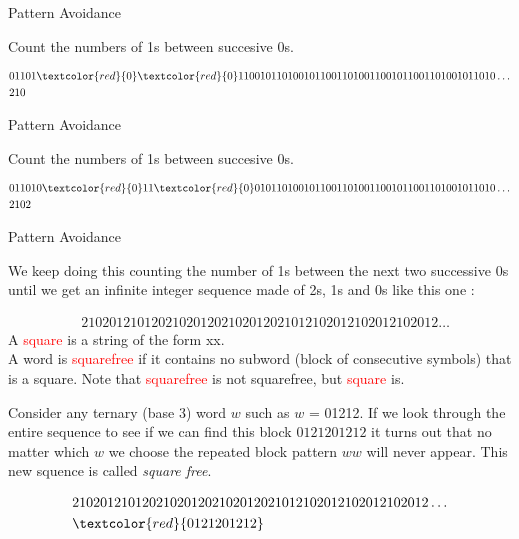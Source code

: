 \documentclass{beamer}
\begin{document}
\begin{frame}{Pattern Avoidance}

    Count the numbers of 1s between succesive 0s.
    
    \[
    \begin{aligned}
        &01101\textcolor{red}{0}\textcolor{red}{0}11001011010010110011010011001011001101001011010\dots \\ 
        &210
    \end{aligned}
    \]
 
\end{frame}

\begin{frame}{Pattern Avoidance}

    Count the numbers of 1s between succesive 0s.
    
    \[
    \begin{aligned}
        &011010\textcolor{red}{0}11\textcolor{red}{0}01011010010110011010011001011001101001011010\dots \\ 
        &2102
    \end{aligned}
    \]
 
\end{frame}

\begin{frame}{Pattern Avoidance}

    We keep doing this counting the number of 1s between the next two successive 0s until we get an infinite integer sequence made of 2s, 1s and 0s like this one :
    
    \[
    \begin{aligned}
        &210201210120210201202102012021012102012102012102012\dots
    \end{aligned}
    \]
    A \textcolor{red}{square} is a string of the form xx.\\
    A word is \textcolor{red}{squarefree} if it contains no subword (block of consecutive symbols) that is a square. Note that \textcolor{red}{squarefree} is not squarefree, but \textcolor{red}{square} is.

    Consider any ternary (base 3) word $w$ such as  $w$ = 01212. If we look through the entire sequence to see if we can find this block $0121201212$ it turns out that no matter which $w$ we choose the repeated block pattern $ww$ will never appear. This new squence is called \textit{square free}.

    \[
    \begin{aligned}
        &210201210120210201202102012021012102012102012102012\dots \\
        &\textcolor{red}{0121201212}
    \end{aligned}
    \]
 
\end{frame}
\end{document}

